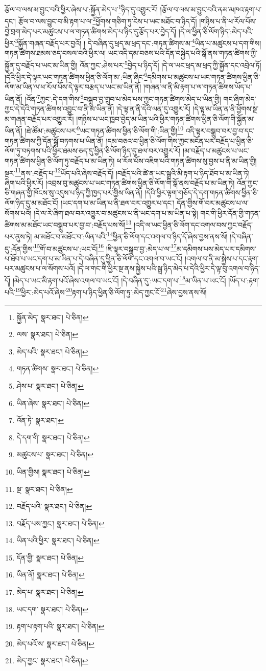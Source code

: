 རྩོལ་བ་ལས་མ་བྱུང་བའི་ཕྱིར་ཞེས་པ་:སྐྱོན་མེད་པ་\footnote{སྐྱོན་མེད་  སྣར་ཐང་།  པེ་ཅིན། }ཉིད་དུ་འགྱུར་རོ། །རྩོལ་བ་ལས་མ་བྱུང་བའི་ནམ་མཁའ་རྟག་པ་དང་། རྩོལ་བ་ལས་བྱུང་བ་མི་རྟག་པ་ལ་\footnote{ལས་  སྣར་ཐང་།  པེ་ཅིན། }ཕྱོགས་གཅིག་ཏུ་ངེས་པ་ཡང་མཐོང་བ་ཉིད་དོ། །གཉིས་པ་ནི་ཕ་རོལ་པོས་བྱེ་བྲག་མེད་པར་མཚུངས་པ་ལ་གཏན་ཚིགས་མེད་པ་ཉིད་དུ་རྩོད་པར་བྱེད་དོ། །དེ་ལ་ཕྱིན་ཅི་ལོག་ཉིད་:མེད་པའི་ཕྱིར་\footnote{མེད་པའི་  སྣར་ཐང་།  པེ་ཅིན། }སྐྱོན་གཞན་བརྗོད་པར་བྱའོ། །
དེ་བཞིན་དུ་ཕྲད་མ་ཕྲད་དང་:གཏན་ཚིགས་མ་\footnote{གཏན་ཚིགས་  སྣར་ཐང་།  པེ་ཅིན། }ཡིན་པ་མཚུངས་པ་དག་གིས། གཏན་ཚིགས་ཐམས་ཅད་བསལ་བའི་ཕྱིར་ལ། ཡང་འདི་དམ་བཅས་པའི་དོན་བསྐྱེད་པའི་སྒོ་ནས་གཏན་ཚིགས་ཀྱི་སྐྱོན་དུ་བརྗོད་པ་ཡང་མ་ཡིན་གྱི། འོན་ཀྱང་:ཤེས་པར་\footnote{ཤེས་པ་  སྣར་ཐང་།  པེ་ཅིན། }བྱེད་པ་ཉིད་དོ། །དེ་ལ་ཡང་ཕྲད་མ་ཕྲད་ཀྱི་སྐྱོན་དང་འབྲེལ་ཏོ། །དེའི་ཕྱིར་དེ་ལྟར་ཡང་གཏན་ཚིགས་ཕྱིན་ཅི་ལོག་མ་:ཡིན་ཞིང་\footnote{ཡིན་ཞེས་  སྣར་ཐང་།  པེ་ཅིན། }དམིགས་པ་མཚུངས་པ་ཡང་གཏན་ཚིགས་ཕྱིན་ཅི་ལོག་མ་ཡིན་ལ་ཕ་རོལ་པོས་དེ་ལྟར་བརྩད་པ་ཡང་མ་ཡིན་ནོ། །གཞན་ལ་ནི་མི་རྟག་པ་ལ་གཏན་ཚིགས་ཡོད་པ་ཡིན་ནོ། །འོན་\footnote{འོན་ཏེ་  སྣར་ཐང་། }ཀྱང་:དེ་དག་གིས་\footnote{དེ་དག་གི་  སྣར་ཐང་།  པེ་ཅིན། }བསྒྲུབ་བྱ་གྲུབ་པ་མེད་པས་ཀྱང་གཏན་ཚིགས་མེད་པ་ཡིན་གྱི། གང་ཞིག་མེད་ཀྱང་དེ་དེའི་གཏན་ཚིགས་འབྱུང་བ་ནི་མ་ཡིན་ནོ། །དེ་ལྟ་ན་ནི་དེའི་ལན་དུ་འགྱུར་རོ། །དེ་ལྟ་མ་ཡིན་ན་ནི་ཕྱོགས་སྔ་མ་གཞན་བརྗོད་པར་འགྱུར་རོ། །གཉིས་པ་ཡང་ཁྱབ་བྱེད་མ་ཡིན་པའི་ཕྱིར་གཏན་ཚིགས་ཕྱིན་ཅི་ལོག་གི་སྐྱོན་མ་ཡིན་ནོ། །ཐེ་ཚོམ་:མཚུངས་པར་\footnote{མཚུངས་པ་  སྣར་ཐང་།  པེ་ཅིན། }ཡང་གཏན་ཚིགས་ཕྱིན་ཅི་ལོག་གི་:ཡིན་གྱི།\footnote{ཡིན་གྱིས།  སྣར་ཐང་།  པེ་ཅིན། } འདི་ལྟར་བསྒྲུབ་བར་བྱ་བ་དང་གཏན་ཚིགས་ཀྱི་དོན་སྒྲོ་བཏགས་པ་ཡིན་ནོ། །དམ་བཅའ་བ་ཕྱིན་ཅི་ལོག་གིས་ཀྱང་མངོན་པར་བརྗོད་པ་ཕྱིན་ཅི་ལོག་ཏུ་བཏགས་པའི་ཕྱིར་ཐམས་ཅད་དུ་ཕྱིན་ཅི་ལོག་ཉིད་དུ་ཐལ་བར་འགྱུར་རོ། །མ་བརྗོད་པ་མཚུངས་པ་ཡང་གཏན་ཚིགས་ཕྱིན་ཅི་ལོག་ཏུ་བརྗོད་པ་མ་ཡིན་ཏེ། ཕ་རོལ་པོས་འཇིག་པའི་གཏན་ཚིགས་སུ་བྱས་པ་ནི་མ་ཡིན་གྱི། སྔར་\footnote{སྔ་  སྣར་ཐང་།  པེ་ཅིན། }ནས་:བརྗོད་པ་\footnote{བརྗོད་པའི་  སྣར་ཐང་།  པེ་ཅིན། }ཡོད་པའི་ཞེས་བརྗོད་དོ། །བརྗོད་པའི་ཚེ་ན་ཡང་སྒྲའི་མི་རྟག་པ་ཉིད་ཐོབ་པ་མ་ཡིན་ཏེ། ཞིག་པའི་ཕྱིར་རོ། །འབྲས་བུ་མཚུངས་པ་ཡང་གཏན་ཚིགས་ཕྱིན་ཅི་ལོག་གི་སྒོ་ནས་བརྗོད་པ་མ་ཡིན་ཏེ། འོན་ཀྱང་ཅི་གཞན་གྱི་ཁོངས་སུ་འདུས་པ་ཉིད་ཀྱི་ཁྱད་པར་གྱིས་ཡིན་ནོ། །དེའི་ཕྱིར་ལྟག་གཅོད་དེ་དག་གཏན་ཚིགས་ཕྱིན་ཅི་ལོག་ཉིད་དུ་མ་མཐོང་ངོ། །ཡང་དག་པ་མ་ཡིན་པ་ནི་ཐལ་བར་འགྱུར་པ་དང་། དོན་གྱིས་གོ་བར་མཚུངས་པ་ལ་སོགས་པའོ། །དེ་ལ་རེ་ཞིག་ཐལ་བར་འགྱུར་བ་མཚུངས་པ་ནི་ཡང་དག་པ་མ་ཡིན་པ་སྟེ། གང་གི་ཕྱིར་དོན་གྱི་གཏན་ཚིགས་མ་མཐོང་ཡང་བསྒྲུབ་པར་བྱ་བ་:བརྗོད་པས་སོ།\footnote{བརྗོད་པས་ཀྱང་།  སྣར་ཐང་།  པེ་ཅིན། } །འདི་ལ་ཡང་ཕྱིན་ཅི་ལོག་དང་འགལ་བས་ཀྱང་བརྗོད་པར་ནུས་ཏེ། མ་མཐོང་བ་མཐོང་བ་:ཡིན་པའི་\footnote{ཡིན་པའི་ཕྱིར་  སྣར་ཐང་།  པེ་ཅིན། }ཕྱིན་ཅི་ལོག་དང་འགལ་བ་ཉིད་དོ་ཞེས་བྱས་ནས་སོ། །དེ་བཞིན་དུ་:དོན་གྱིས་\footnote{དོན་གྱི་  སྣར་ཐང་།  པེ་ཅིན། }གོ་བ་མཚུངས་པ་:ཡང་ངོ།\footnote{ཡིན་ནོ།  སྣར་ཐང་།  པེ་ཅིན། } །ཇི་ལྟར་བསྒྲུབ་བྱ་:མེད་པ་ལ་\footnote{མེད་པ་  སྣར་ཐང་།  པེ་ཅིན། }མ་དམིགས་པས་མེད་པར་དམིགས་པ་ཐོབ་པ་ཡང་དག་པ་མ་ཡིན་པ་དེ་བཞིན་དུ་ཕྱིན་ཅི་ལོག་དང་འགལ་བ་ཡང་ངོ། །འགལ་བ་ནི་མ་སྐྱེས་པ་དང་རྟག་པར་མཚུངས་པ་ལ་སོགས་པའོ། །དེ་ལ་གང་གི་ཕྱིར་སྔ་ནས་སྐྱེས་པའི་སྒྲ་ཉིད་མེད་པ་དེའི་ཕྱིར་དེ་ལྟ་བུ་འགལ་བ་ཉིད་དོ། །མེད་པ་ཡང་མི་རྟག་པའོ་ཞེས་འགལ་བ་ཡང་ངོ། །དེ་བཞིན་དུ་:ཡང་དག་པ་\footnote{ཡང་དག་  སྣར་ཐང་།  པེ་ཅིན། }མ་ཡིན་པ་ཡང་ངོ། །ཡོད་པ་:རྟག་པའི་\footnote{རྟག་པ་རྟག་པའི་  སྣར་ཐང་།  པེ་ཅིན། }ཕྱིར་:མེད་པའོ་ཞེས་\footnote{མེད་པའོ་ས་  སྣར་ཐང་།  པེ་ཅིན། }རྟག་པ་ཉིད་ཕྱིན་ཅི་ལོག་ཏུ་:མེད་ཀྱང་ངོ་\footnote{མེད་ཀྱང་  སྣར་ཐང་།  པེ་ཅིན། }ཞེས་བྱས་ནས་སོ། 